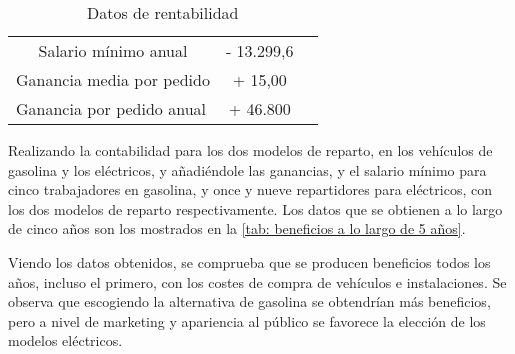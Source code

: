\begin{table}[H]
\begin{tabular}{ccc}
\multicolumn{1}{|c|}{Salario mínimo anual}      & \multicolumn{1}{c|}{- 13.299,6}                     & \multicolumn{1}{l}{}                                 \\ \cline{1-2}
\multicolumn{1}{|c|}{Ganancia media por pedido} & \multicolumn{1}{c|}{+ 15,00}                        &                                                      \\ \cline{1-2}
\multicolumn{1}{|l|}{Ganancia por pedido anual} & \multicolumn{1}{c|}{+ 46.800}                       & \multicolumn{1}{l}{}                                 \\ \cline{1-2}
\end{tabular}
\caption{Datos de rentabilidad}
\label{tab: datos de rentabilidad}
\end{table}

Realizando la contabilidad para los dos modelos de reparto, en los vehículos de gasolina y los eléctricos, y añadiéndole las ganancias, y el salario mínimo para cinco trabajadores en gasolina, y once y nueve repartidores para eléctricos, con los dos modelos de reparto respectivamente. Los datos que se obtienen a lo largo de cinco años son los mostrados en la \autoref{tab: beneficios a lo largo de 5 años}.

\begin{table}[H]
\centering
{}
\caption{Beneficios a lo largo de 5 años}
\label{tab: beneficios a lo largo de 5 años}
\end{table}

Viendo los datos obtenidos, se comprueba que se producen beneficios todos los años, incluso el primero, con los costes de compra de vehículos e instalaciones. Se observa que escogiendo la alternativa de gasolina se obtendrían más beneficios, pero a nivel de marketing y apariencia al público se favorece la elección de los modelos eléctricos.

